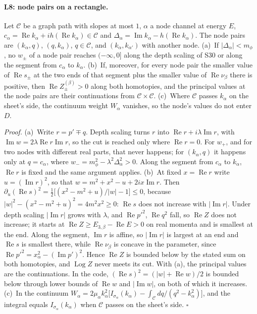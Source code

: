 \documentclass[11pt]{article}
\begin{document}
\paragraph{L8: node pairs on a rectangle.} Let $\mathcal C$ be a graph path with slopes at most $1$, $\alpha$ a node channel at energy $E$, $c_\alpha=\operatorname{Re}k_\alpha+ih(\operatorname{Re}k_\alpha)\in\mathcal C$ and $\Delta_\alpha=\operatorname{Im}k_\alpha-h(\operatorname{Re}k_\alpha)$. The node pairs are $(k_\alpha,q)$, $(q,k_\alpha)$, $q\in\mathcal C$, and $(k_\alpha,k_{\alpha'})$ with another node.
(a)~If $|\Delta_\alpha|<m_\phi$, no $w_\pm$ of a node pair reaches $(-\infty,0]$ along the depth scaling of S30 or along the segment from $c_\alpha$ to $k_\alpha$.
(b)~If, moreover, for every node pair the smaller value of $\operatorname{Re}s_\pm$ at the two ends of that segment plus the smaller value of $\operatorname{Re}\nu_\beta$ there is positive, then $\operatorname{Re}Z^{(\beta)}_\pm>0$ along both homotopies, and the principal values at the node pairs are their continuations from $\mathcal C\times\mathcal C$.
(c)~Where $\mathcal C$ passes $k_\alpha$ on the sheet's side, the continuum weight $W_\alpha$ vanishes, so the node's values do not enter $D$.

\emph{Proof.} (a)~Write $r=p'\mp q$. Depth scaling turns $r$ into $\operatorname{Re}r+i\lambda\operatorname{Im}r$, with $\operatorname{Im}w=2\lambda\operatorname{Re}r\operatorname{Im}r$, so the cut is reached only where $\operatorname{Re}r=0$. For $w_+$, and for two nodes with different real parts, that never happens; for $(k_\alpha,q)$ it happens only at $q=c_\alpha$, where $w_-=m_\phi^2-\lambda^2\Delta_\alpha^2>0$. Along the segment from $c_\alpha$ to $k_\alpha$, $\operatorname{Re}r$ is fixed and the same argument applies.
(b)~At fixed $x=\operatorname{Re}r$ write $u=(\operatorname{Im}r)^2$, so that $w=m^2+x^2-u+2ix\operatorname{Im}r$. Then $\partial_u(\operatorname{Re}s)^2=\tfrac12\bigl[(x^2-m^2+u)/|w|-1\bigr]\le0$, because $|w|^2-(x^2-m^2+u)^2=4m^2x^2\ge0$: $\operatorname{Re}s$ does not increase with $|\operatorname{Im}r|$. Under depth scaling $|\operatorname{Im}r|$ grows with $\lambda$, and $\operatorname{Re}p'^2$, $\operatorname{Re}q^2$ fall, so $\operatorname{Re}Z$ does not increase; it starts at $\operatorname{Re}Z\ge E_{3,\beta}-\operatorname{Re}E>0$ on real momenta and is smallest at the end. Along the segment, $\operatorname{Im}r$ is affine, so $|\operatorname{Im}r|$ is largest at an end and $\operatorname{Re}s$ is smallest there, while $\operatorname{Re}\nu_\beta$ is concave in the parameter, since $\operatorname{Re}p'^2=x_\alpha^2-(\operatorname{Im}p')^2$. Hence $\operatorname{Re}Z$ is bounded below by the stated sum on both homotopies, and $\operatorname{Log}Z$ never meets its cut. With (a), the principal values are the continuations. In the code, $(\operatorname{Re}s)^2=(|w|+\operatorname{Re}w)/2$ is bounded below through lower bounds of $\operatorname{Re}w$ and $|\operatorname{Im}w|$, on both of which it increases.
(c)~In the continuum $W_\alpha=2\mu_\alpha k_\alpha^2\bigl[I_{\sigma_\alpha}(k_\alpha)-\int_{\mathcal C}dq/(q^2-k_\alpha^2)\bigr]$, and the integral equals $I_{\sigma_\alpha}(k_\alpha)$ when $\mathcal C$ passes on the sheet's side. $\square$
\end{document}
